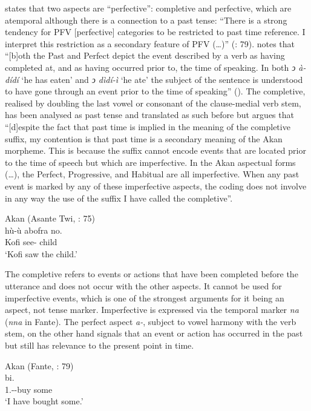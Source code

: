 \documentclass[output=paper]{langscibook}
\begin{document}
\citet{osam2008} states that two aspects are “perfective”: completive and perfective, which are atemporal although there is a connection to a past tense: “There is a strong tendency for PFV [perfective] categories to be restricted to past time reference. I interpret this restriction as a secondary feature of PFV (…)” (\citealt{dahl1985}: 79). \citet{boadi2008} notes that “[b]oth the Past and Perfect depict the event described by a verb as having completed at, and as having occurred prior to, the time of speaking. In both \emph{ͻ à-dídí} ‘he has eaten’ and\emph{ ͻ dìdí-ì} ‘he ate’ the subject of the sentence is understood to have gone through an event prior to the time of speaking” (\citeyear[24]{boadi2008}).
The completive, realised by doubling the last vowel or consonant of the clause-medial verb stem, has been analysed as past tense and translated as such before but \citet[85]{osam2008} argues that “[d]espite the fact that past time is implied in the meaning of the completive suffix, my contention is that past time is a secondary meaning of the Akan morpheme. This is because the suffix cannot encode events that are located prior to the time of speech but which are imperfective. In the Akan aspectual forms (…), the Perfect, Progressive, and Habitual are all imperfective. When any past event is marked by any of these imperfective aspects, the coding does not involve in any way the use of the suffix I have called the completive”.

\begin{exe}
\ex \label{Paj8} Akan (Asante Twi, \citealt{osam2008}: 75) \\ 
 {hù-ù} {abofra} {no.}\\
    Kofi see-{\compl} child \\
\glt `Kofi saw the child.’\\
\end{exe}


The completive refers to events or actions that have been completed before the utterance and does not occur with the other aspects. It cannot be used for imperfective events, which is one of the strongest arguments for it being an aspect, not tense marker. Imperfective is expressed via the temporal marker \emph{na} (\emph{nna} in Fante). 
The perfect aspect \emph{a-}, subject to vowel harmony with the verb stem, on the other hand signals that an event or action has occurred in the past but still has relevance to the present point in time.

\begin{exe}
\ex \label{Paj9} Akan (Fante, \citealt{osam2008}: 79) \\ 
 {bi.}\\
    1{\sg}.{\subj}--buy some\\
\glt `I have bought some.’\\
\end{exe}
\end{document}
